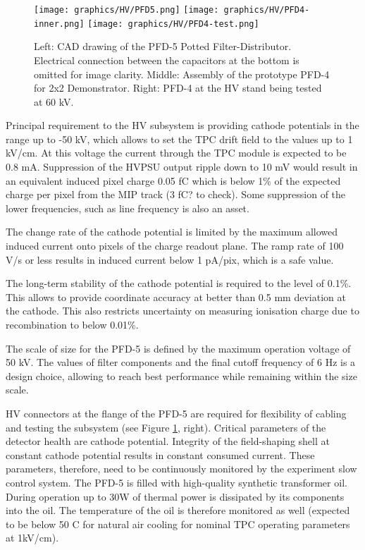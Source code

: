 \begin{figure}[htbp]
\centering 
\texttt{[image: graphics/HV/PFD5.png]}
\texttt{[image: graphics/HV/PFD4-inner.png]}
\texttt{[image: graphics/HV/PFD4-test.png]}
\caption{\label{fig:pfd5cad} Left: CAD drawing of the PFD-5 Potted Filter-Distributor. Electrical connection between the capacitors at the bottom is omitted for image clarity. Middle: Assembly of the prototype PFD-4 for 2x2 Demonstrator. Right: PFD-4 at the HV stand being tested at 60 kV.}
\end{figure}


Principal requirement to the HV subsystem is providing cathode potentials in the range up to -50 kV, which allows to set the TPC drift field to the values up to 1 kV/cm. At this voltage the current through the TPC module is expected to be 0.8 mA.
Suppression of the HVPSU output ripple down to 10 mV would result in an equivalent induced pixel charge 0.05 fC which is below 1\% of the expected charge per pixel from the MIP track (3 fC? to check). Some suppression of the lower frequencies, such as line frequency is also an asset. 

The change rate of the cathode potential is limited by the maximum allowed induced current onto pixels of the charge readout plane. The ramp rate of 100 V/s or less results in induced current below 1 pA/pix, which is a safe value.

The long-term stability of the cathode potential is required to the level of 0.1\%. This allows to provide coordinate accuracy
at better than 0.5 mm deviation at the cathode. This also restricts uncertainty on measuring ionisation charge due to recombination to below 0.01\%.

The scale of size for the PFD-5 is defined by the maximum operation voltage of 50 kV. The values of filter components and the final cutoff frequency of 6 Hz is a design choice, allowing to reach best performance while remaining within the size scale.

HV connectors at the flange of the PFD-5 are required for flexibility of cabling and testing the subsystem (see Figure \ref{fig:pfd5cad}, right). 
Critical parameters of the detector health are cathode potential. Integrity of the field-shaping shell at constant cathode potential results in constant consumed current. These parameters, therefore, need to be continuously monitored by the experiment slow control system. The PFD-5 is filled with high-quality synthetic transformer oil. During operation up to 30W of thermal power is dissipated by its components into the oil. The temperature of the oil is therefore monitored as well (expected to be below 50 C for natural air cooling for nominal TPC operating parameters at 1kV/cm). 

